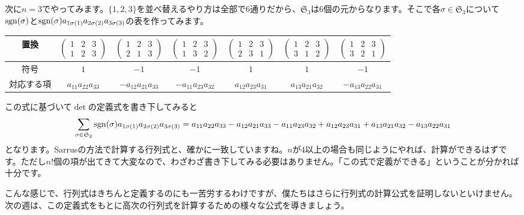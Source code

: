 次に$n = 3$でやってみます。$\{1, 2, 3\}$を並べ替えるやり方は全部で$6$通りだから、$\mathfrak{S}_3$は$6$個の元からなります。そこで各$\sigma \in \mathfrak{S}_3$について$\operatorname{sgn}(\sigma)$と$\operatorname{sgn}(\sigma) a_{1\sigma(1)} a_{2\sigma(2)} a_{3\sigma(3)}$の表を作ってみます。
\begin{table}[h!tbp]
\centering
\begin{tabular}{c||cccccc} \hline
置換 &
$\begin{pmatrix}
1 & 2 & 3 \\
1 & 2 & 3
\end{pmatrix}$ & 
$\begin{pmatrix}
1 & 2 & 3 \\
2 & 1 & 3
\end{pmatrix}$ & 
$\begin{pmatrix}
1 & 2 & 3 \\
1 & 3 & 2
\end{pmatrix}$ & 
$\begin{pmatrix}
1 & 2 & 3 \\
2 & 3 & 1
\end{pmatrix}$ & 
$\begin{pmatrix}
1 & 2 & 3 \\
3 & 1 & 2
\end{pmatrix}$ & 
$\begin{pmatrix}
1 & 2 & 3 \\
3 & 2 & 1
\end{pmatrix}$ \\ \hline
符号 & $1$ & $-1$ & $-1$ & $1$ & $1$ & $-1$ \\ \hline
対応する項 & $a_{11} a_{22} a_{33}$ & $-a_{12} a_{21} a_{33}$ & $-a_{11} a_{23} a_{32}$ & $a_{12} a_{23} a_{31}$ & $a_{13} a_{21} a_{32}$ & $-a_{13} a_{22} a_{31}$ \\ \hline
\end{tabular}
\end{table}

この式に基づいて$\det$の定義式を書き下してみると
\[
\sum_{\sigma \in \mathfrak{S}_2} \operatorname{sgn}(\sigma) a_{1 \sigma(1)} a_{2 \sigma(2)} a_{3 \sigma(3)}
= a_{11} a_{22} a_{33} - a_{12} a_{21} a_{33} - a_{11} a_{23} a_{32} + a_{12} a_{23} a_{31} + a_{13} a_{21} a_{32} - a_{13} a_{22} a_{31}
\]
となります。Sarrusの方法で計算する行列式と、確かに一致していますね。$n$が$4$以上の場合も同じようにやれば、計算ができるはずです。ただし$n!$個の項が出てきて大変なので、わざわざ書き下してみる必要はありません。「この式で定義ができる」ということが分かれば十分です。

こんな感じで、行列式はきちんと定義するのにも一苦労するわけですが、僕たちはさらに行列式の計算公式を証明しないといけません。次の週は、この定義式をもとに高次の行列式を計算するための様々な公式を導きましょう。

